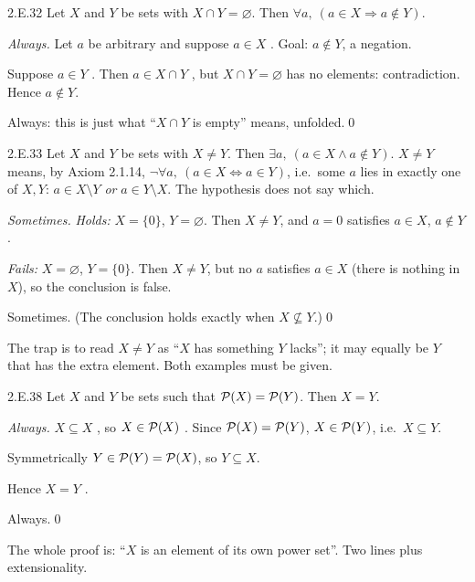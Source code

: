 \begin{bookex}[recommended]{2.E.32}
Let $X$ and $Y$ be sets with $X\cap Y=\varnothing$. Then $\forall a,\ (a\in X\Rightarrow a\notin Y)$.
\solution
\begin{steps}
\item \emph{Always.} Let $a$ be arbitrary and suppose $a\in X$ . Goal: $a\notin Y$, a negation.
\item Suppose $a\in Y$ . Then $a\in X\cap Y$ , but $X\cap Y=\varnothing$ has no elements: contradiction. Hence $a\notin Y$.
\end{steps}
\conclusion Always: this is just what ``$X\cap Y$ is empty'' means, unfolded.\qed
\end{bookex}

\begin{bookex}[essential]{2.E.33}
Let $X$ and $Y$ be sets with $X\ne Y$. Then $\exists a,\ (a\in X\wedge a\notin Y)$.
\solution
\given $X\ne Y$ means, by Axiom 2.1.14, $\neg\forall a,\ (a\in X\Leftrightarrow a\in Y)$, i.e.\ some $a$ lies in exactly one of $X,Y$: $a\in X\setminus Y$ \emph{or} $a\in Y\setminus X$. The hypothesis does not say which.
\begin{steps}
\item \emph{Sometimes.} \emph{Holds:} $X=\{0\}$, $Y=\varnothing$. Then $X\ne Y$, and $a=0$ satisfies $a\in X$, $a\notin Y$.
\item \emph{Fails:} $X=\varnothing$, $Y=\{0\}$. Then $X\ne Y$, but no $a$ satisfies $a\in X$ (there is nothing in $X$), so the conclusion is false.
\end{steps}
\conclusion Sometimes. (The conclusion holds exactly when $X\nsubseteq Y$.)\qed
\begin{compare}
\item The trap is to read $X\ne Y$ as ``$X$ has something $Y$ lacks''; it may equally be $Y$ that has the extra element. Both examples must be given.
\end{compare}
\end{bookex}

\begin{bookex}[essential]{2.E.38}
Let $X$ and $Y$ be sets such that $\mathcal{P}(X)=\mathcal{P}(Y)$. Then $X=Y$.
\solution
\begin{steps}
\item \emph{Always.} $X\subseteq X$ , so $X\in\mathcal{P}(X)$ . Since $\mathcal{P}(X)=\mathcal{P}(Y)$, $X\in\mathcal{P}(Y)$, i.e.\ $X\subseteq Y$.
\item Symmetrically $Y\in\mathcal{P}(Y)=\mathcal{P}(X)$, so $Y\subseteq X$.
\item Hence $X=Y$ .
\end{steps}
\conclusion Always.\qed
\begin{compare}
\item The whole proof is: ``$X$ is an element of its own power set''. Two lines plus extensionality.
\end{compare}
\end{bookex}

